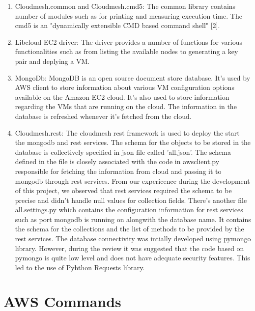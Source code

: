 \documentclass[9pt,twocolumn,twoside]{../../styles/osajnl}
\begin{document}
\begin{enumerate}
	\item Cloudmesh.common and Cloudmesh.cmd5: The common library contains number of modules such as for printing and measuring execution time. The cmd5 is an "dynamically extensible CMD based command shell" [2].

	\item Libcloud EC2 driver: The driver provides a number of functions for various functionalities such as from listing the available nodes to generating a key pair and deplying a VM.

	\item MongoDb: MongoDB is an open source document store database. It's used by AWS client to store information about various VM configuration options available on the Amazon EC2 cloud. It's also used to store information regarding the VMs that are running on the cloud. The information in the database is refreshed whenever it's fetched from the cloud.

	\item Cloudmesh.rest: The cloudmesh rest framework is used to deploy the start the mongodb and rest services. The schema for the objects to be stored in the database is collectively specified in json file called 'all.json'. The schema defined in the file is closely associated with the code in awsclient.py responsible for fetching the information from cloud and passing it to mongodb through rest services. From our expericence during the development of this project, we observed that rest services required the schema to be precise and didn't handle null values for collection fields. There's another file all.settings.py which contains the configuration information for rest services such as port mongodb is running on alongwith the database name. It contains the schema for the collections and the list of methods to be provided by the rest services. The database connectivity was intially developed using pymongo library. However, during the review it was suggested that the code based on pymongo is quite low level and does not have adequate security features. This led to the use of Pyhthon Requests library.
	
\end{enumerate}

\section{AWS Commands}
\end{document}
